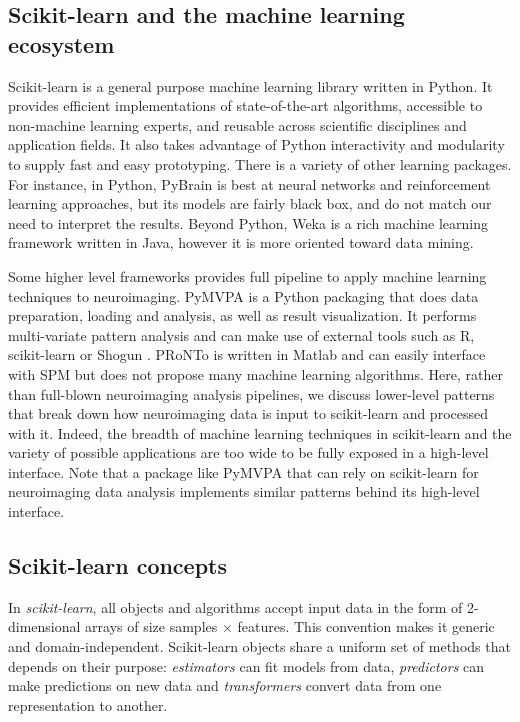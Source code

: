 \documentclass{frontiersSCNS} %
\begin{document}
\subsection{Scikit-learn and the machine learning ecosystem}

Scikit-learn \citep{pedregosa2011} is a general purpose machine learning
library written in Python.
It provides efficient implementations of state-of-the-art algorithms,
accessible to non-machine learning experts,
and reusable across scientific disciplines and application fields. It also
takes advantage of Python interactivity and modularity to supply fast and easy
prototyping. There is a variety of other learning packages. For instance,
in Python, PyBrain \citep{schaul2010pybrain} is best at neural networks
and reinforcement learning approaches, but its models are fairly black box,
and do not match our need to interpret the results.
Beyond Python, Weka \citep{hall2009weka} is a rich machine learning framework
written in Java,
however it is more oriented toward data mining. 

Some higher level frameworks provides full pipeline to apply machine
learning techniques to neuroimaging. PyMVPA \citep{hanke2009pymvpa} is a
Python packaging that does data preparation, loading and analysis, as well as
result visualization. It performs multi-variate pattern analysis
and can make use of external tools such as R, scikit-learn or Shogun
\citep{sonnenburg2010}.
PRoNTo \citep{schrouff2013pronto} is written in Matlab and can easily
interface with SPM but does not propose many machine learning algorithms.
Here, rather than full-blown neuroimaging analysis pipelines, we discuss
lower-level patterns that break down how neuroimaging
data is input to scikit-learn and processed with it. Indeed, the breadth
of machine learning techniques in scikit-learn and the variety of
possible applications are too wide to be fully exposed in a high-level
interface. Note that a package like PyMVPA that can rely on scikit-learn for
neuroimaging data analysis implements similar patterns behind its
high-level interface.

\subsection{Scikit-learn concepts}
\label{scikitlearn}

In {\em scikit-learn}, all objects and algorithms accept input data in the form of
2-dimensional arrays of size samples $\times$ features.
This convention makes it generic and domain-independent.
Scikit-learn objects share a uniform set of methods that
depends on their purpose: \textit{estimators} can fit models from data,
\textit{predictors} can make predictions on new data and \textit{transformers}
convert data from one representation to another.
\end{document}
